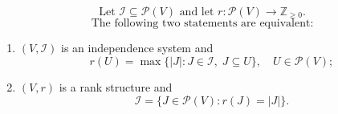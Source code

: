 $$
\text{Let }\mathcal{I} \subseteq \mathcal{P}(V)\text{ and let }r\colon \mathcal{P}(V)\to \mathbb{Z}_{\geq 0}.
$$
$$
\text{The following two statements are equivalent:}
$$

\begin{enumerate}
\item[(a)] $(V, \mathcal{I})$ is an independence system and
$$
r(U) = \max\{|J| : J \in \mathcal{I},\; J \subseteq U\}, \quad U \in \mathcal{P}(V);
$$

\item[(b)] $(V, r)$ is a rank structure and
$$
\mathcal{I} = \{J \in \mathcal{P}(V) : r(J) = |J|\}.
$$
\end{enumerate}

